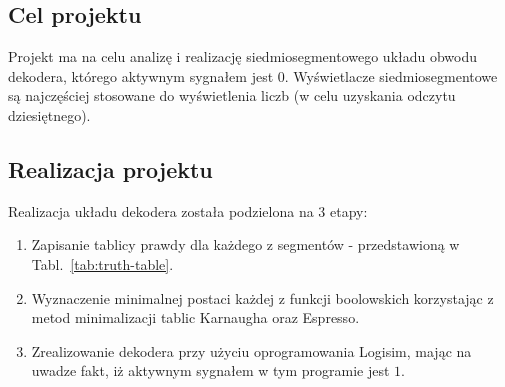 \subsection{Cel projektu}\label{subsec:intro-goal}
Projekt ma na celu analizę i realizację siedmiosegmentowego układu obwodu dekodera, którego aktywnym sygnałem jest $0$.
Wyświetlacze siedmiosegmentowe są najczęściej stosowane do
wyświetlenia liczb (w celu uzyskania odczytu dziesiętnego).

\subsection{Realizacja projektu}\label{subsec:intro-how}
Realizacja układu dekodera została podzielona na 3 etapy:
\begin{enumerate}
    \item Zapisanie tablicy prawdy dla każdego z segmentów - przedstawioną w Tabl.~\ref{tab:truth-table}.
    \item Wyznaczenie minimalnej postaci każdej z funkcji boolowskich korzystając
          z metod minimalizacji tablic Karnaugha oraz Espresso.
    \item Zrealizowanie dekodera przy użyciu oprogramowania Logisim, mając na uwadze fakt,
          iż aktywnym sygnałem w tym programie jest $1$.
\end{enumerate}

